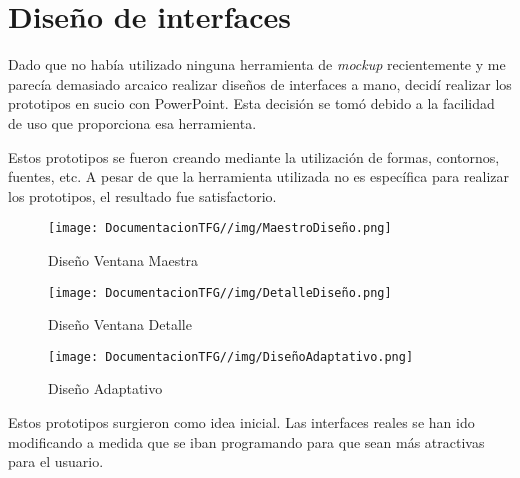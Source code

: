 \section{Diseño de interfaces}
Dado que no había utilizado ninguna herramienta de \textit{mockup} recientemente y me parecía demasiado arcaico realizar diseños de interfaces a mano, decidí realizar los prototipos en sucio con PowerPoint. Esta decisión se tomó debido a la facilidad de uso que proporciona esa herramienta. 

Estos prototipos se fueron creando mediante la utilización de formas, contornos, fuentes, etc. A pesar de que la herramienta utilizada no es específica para realizar los prototipos, el resultado fue satisfactorio.

\begin{figure}[H]
    \centering
    \texttt{[image: DocumentacionTFG//img/MaestroDiseño.png]}
    \caption{Diseño Ventana Maestra}
\end{figure}

\begin{figure}[H]
    \centering
    \texttt{[image: DocumentacionTFG//img/DetalleDiseño.png]}
    \caption{Diseño Ventana Detalle}
\end{figure}

\begin{figure}[H]
    \centering
    \texttt{[image: DocumentacionTFG//img/DiseñoAdaptativo.png]}
    \caption{Diseño Adaptativo}
\end{figure}

Estos prototipos surgieron como idea inicial. Las interfaces reales se han ido modificando a medida que se iban programando para que sean más atractivas para el usuario.
